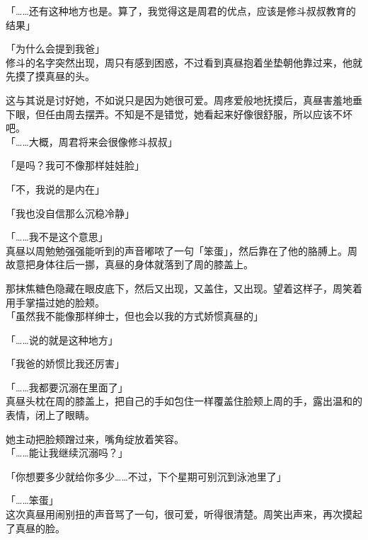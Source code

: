 「……还有这种地方也是。算了，我觉得这是周君的优点，应该是修斗叔叔教育的结果」

「为什么会提到我爸」\\

修斗的名字突然出现，周只有感到困惑，不过看到真昼抱着坐垫朝他靠过来，他就先摸了摸真昼的头。

这与其说是讨好她，不如说只是因为她很可爱。周疼爱般地抚摸后，真昼害羞地垂下眼，但任由周去摆弄。不知是不是错觉，她看起来好像很舒服，所以应该不坏吧。\\

「……大概，周君将来会很像修斗叔叔」

「是吗？我可不像那样娃娃脸」

「不，我说的是内在」

「我也没自信那么沉稳冷静」

「……我不是这个意思」\\

真昼以周勉勉强强能听到的声音嘟哝了一句「笨蛋」，然后靠在了他的胳膊上。周故意把身体往后一挪，真昼的身体就落到了周的膝盖上。

那抹焦糖色隐藏在眼皮底下，然后又出现，又盖住，又出现。望着这样子，周笑着用手掌描过她的脸颊。\\

「虽然我不能像那样绅士，但也会以我的方式娇惯真昼的」

「……说的就是这种地方」

「我爸的娇惯比我还厉害」

「……我都要沉溺在里面了」\\

真昼头枕在周的膝盖上，把自己的手如包住一样覆盖住脸颊上周的手，露出温和的表情，闭上了眼睛。

她主动把脸颊蹭过来，嘴角绽放着笑容。\\

「……能让我继续沉溺吗？」

「你想要多少就给你多少……不过，下个星期可别沉到泳池里了」

「……笨蛋」\\

这次真昼用闹别扭的声音骂了一句，很可爱，听得很清楚。周笑出声来，再次摸起了真昼的脸。
